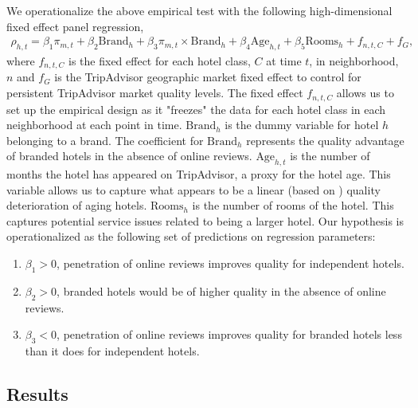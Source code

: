 \documentclass[mksc,blindrev]{informs3} %
\begin{document}
We operationalize the above empirical test with the following high-dimensional fixed effect panel regression,
\begin{equation}\label{eq:nbhd_brand}
\begin{split}
\rho_{h,t}=\beta_{1} \pi_{m,t} + \beta_{2} \text{Brand}_{h} + \beta_{3} \pi_{m,t}\times \text{Brand}_{h} + \beta_{4}\text{Age}_{h,t} + \beta_{5} \text{Rooms}_{h} + f_{n,t,C}+f_{G},
\end{split}
\end{equation}
where $f_{n,t,C}$ is the fixed effect for each hotel class, $C$ at time $t$, in neighborhood, $n$ and $f_{G}$ is the TripAdvisor geographic market fixed effect to control for persistent TripAdvisor market quality levels. The fixed effect $f_{n,t,C}$ allows us to set up the empirical design as it "freezes" the data for each hotel class in each neighborhood at each point in time. $\text{Brand}_h$ is the dummy variable for hotel $h$ belonging to a brand. The coefficient for $\text{Brand}_h$ represents the quality advantage of branded hotels in the absence of online reviews. $\text{Age}_{h,t}$ is the number of months the hotel has appeared on TripAdvisor, a proxy for the hotel age. This variable allows us to capture what appears to be a linear (based on ) quality deterioration of aging hotels.  $\text{Rooms}_{h}$ is the number of rooms of the hotel. This captures potential service issues related to being a larger hotel. Our hypothesis is operationalized as the following set of predictions on regression parameters:
\begin{enumerate}
\item $\beta_1>0$, penetration of online reviews improves quality for independent hotels.
\item $\beta_2>0$, branded hotels would be of higher quality in the absence of online reviews.
\item $\beta_3<0$, penetration of online reviews improves quality for branded hotels less than it does for independent hotels.
\end{enumerate}

\subsection{Results}
\end{document}
